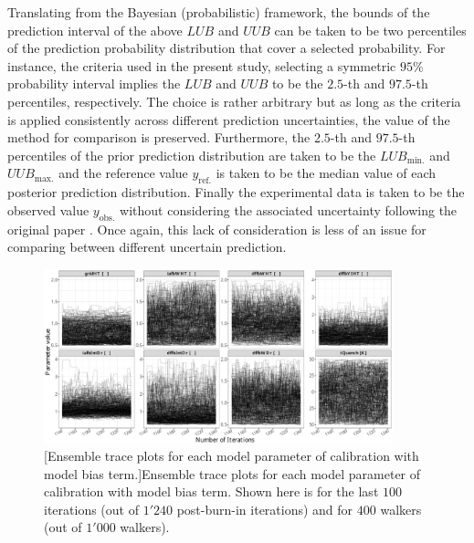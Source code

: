 Translating from the Bayesian (probabilistic) framework, the bounds of the prediction interval of the above $LUB$ and $UUB$ can be taken to be two percentiles of the prediction probability distribution that cover a selected probability.
For instance, the criteria used in the present study, selecting a symmetric $95\%$ probability interval implies the $LUB$ and $UUB$ to be the $2.5$-th and $97.5$-th percentiles, respectively.
The choice is rather arbitrary but as long as the criteria is applied consistently across different prediction uncertainties, the value of the method for comparison is preserved.
Furthermore, the $2.5$-th and $97.5$-th percentiles of the prior prediction distribution are taken to be the $LUB_{\text{min.}}$ and $UUB_{\text{max.}}$ and the reference value $y_\text{ref.}$ is taken to be the median value of each posterior prediction distribution.
Finally the experimental data is taken to be the observed value $y_\text{obs.}$ without considering the associated uncertainty following the original paper \cite{Baccou2014}.
Once again, this lack of consideration is less of an issue for comparing between different uncertain prediction.
 
\clearpage
\begin{figure}
	\centering
	\includegraphics[width=0.90\textwidth]{../figures/chapter5/figures/plotEnsTraceDiscAllCentered}
		[Ensemble trace plots for each model parameter of calibration with model bias term.]{Ensemble trace plots for each model parameter of calibration with model bias term. Shown here is for the last $100$ iterations (out of $1'240$ post-burn-in iterations) and for $400$ walkers (out of $1'000$ walkers).}
	\label{fig:ch5_plot_ens_trace_all_disc_centered}
\end{figure}
\clearpage